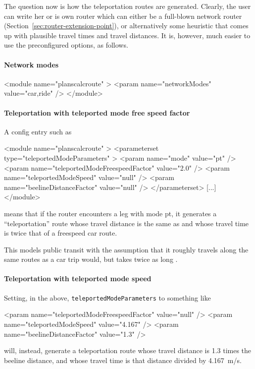 The question now is how the teleportation routes are generated.  Clearly, the user can write her or is own router which can either be a full-blown network router (\cf Section~\ref{sec:router-extension-point}), or alternatively some heuristic that comes up with plausible travel times and travel distances.  It is, however, much easier to use the preconfigured options, as follows.

\paragraph{Network modes}


\begin{xml}
<module name="planscalcroute" >
   <param name="networkModes" value="car,ride" />
</module>
\end{xml}

\paragraph{Teleportation with teleported mode free speed factor}

A config entry such as
\begin{xml}
<module name="planscalcroute" >
   <parameterset type="teleportedModeParameters" >
      <param name="mode" value="pt" />
      <param name="teleportedModeFreespeedFactor" value="2.0" />
      <param name="teleportedModeSpeed" value="null" />
      <param name="beelineDistanceFactor" value="null" />
   </parameterset>
   [...]   
</module>      
\end{xml}
means that if the router encounters a leg with mode pt, it generates a ``teleportation'' route whose travel distance is the same as and whose travel time is twice that of a freespeed car route.

This models public transit with the assumption that it roughly travels along the same routes as a car trip would, but takes twice as long \citep[\cf][]{Reinhold2006Konzeptzurintegrierten}.

\paragraph{Teleportation with teleported mode speed}  Setting, in the above, \lstinline{teleportedModeParameters} to something like
\begin{xml}
      <param name="teleportedModeFreespeedFactor" value="null" />
      <param name="teleportedModeSpeed" value="4.167" />
      <param name="beelineDistanceFactor" value="1.3" />
\end{xml}
will, instead, generate a teleportation route whose travel distance is 1.3 times the beeline distance, and whose travel time is that distance divided by 4.167~m/s.

